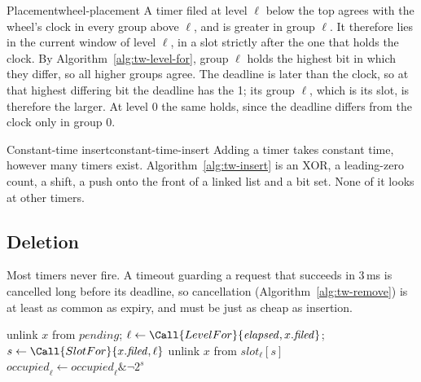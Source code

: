 \begin{lemma}{Placement}{wheel-placement}
    A timer filed at level $\ell$ below the top agrees with the wheel's clock in every group above $\ell$, and is greater in group $\ell$. It therefore lies in the current window of level $\ell$, in a slot strictly after the one that holds the clock.
    \why By Algorithm~\ref{alg:tw-level-for}, group $\ell$ holds the highest bit in which they differ, so all higher groups agree. The deadline is later than the clock, so at that highest differing bit the deadline has the 1; its group $\ell$, which is its slot, is therefore the larger. At level 0 the same holds, since the deadline differs from the clock only in group 0.
\end{lemma}

\begin{lemma}{Constant-time insert}{constant-time-insert}
    Adding a timer takes constant time, however many timers exist.
    \why Algorithm~\ref{alg:tw-insert} is an XOR, a leading-zero count, a shift, a push onto the front of a linked list and a bit set. None of it looks at other timers.
\end{lemma}

\subsection{Deletion}

Most timers never fire. A timeout guarding a request that succeeds in 3\,ms is cancelled long before its deadline, so cancellation (Algorithm~\ref{alg:tw-remove}) is at least as common as expiry, and must be just as cheap as insertion.

\begin{algorithm}[htbp]
    \caption{Removing a timer.}
    \label{alg:tw-remove}
    \begin{algorithmic}[1]
                \State unlink $x$ from $\mathit{pending}$;\enspace \Return{}
            \EndIf
            \State $\ell \gets \Call{LevelFor}{\mathit{elapsed}, x.\mathit{filed}}$;\enspace $s \gets \Call{SlotFor}{x.\mathit{filed}, \ell}$
            \State unlink $x$ from $\mathit{slot}_\ell[s]$
                \State $\mathit{occupied}_\ell \gets \mathit{occupied}_\ell \mathbin{\&} \lnot 2^{s}$
            \EndIf
        \EndFunction
    \end{algorithmic}
\end{algorithm}

